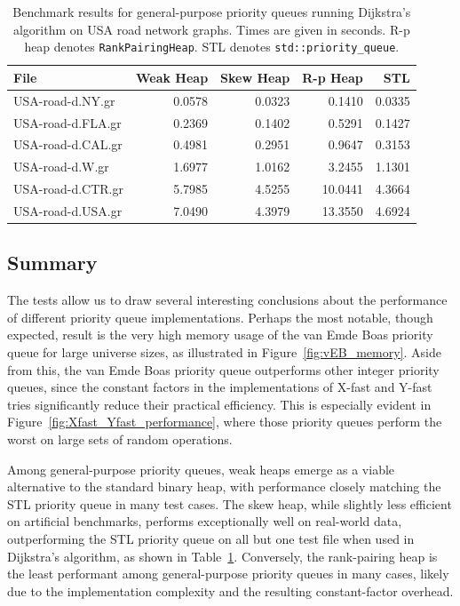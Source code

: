 \begin{table}[ht]
\centering
\begin{tabular}{|l|r|r|r|r|}
\hline
\textbf{File} & \textbf{Weak Heap} & \textbf{Skew Heap} & \textbf{R-p Heap} & \textbf{STL} \\
\hline
USA-road-d.NY.gr   & 0.0578 & 0.0323 & 0.1410 & 0.0335 \\
USA-road-d.FLA.gr  & 0.2369 & 0.1402 & 0.5291 & 0.1427 \\
USA-road-d.CAL.gr  & 0.4981 & 0.2951 & 0.9647 & 0.3153 \\
USA-road-d.W.gr    & 1.6977 & 1.0162 & 3.2455 & 1.1301 \\
USA-road-d.CTR.gr  & 5.7985 & 4.5255 & 10.0441 & 4.3664 \\
USA-road-d.USA.gr  & 7.0490 & 4.3979 & 13.3550 & 4.6924 \\
\hline
\end{tabular}
\caption{Benchmark results for general-purpose priority queues running Dijkstra's algorithm on USA road network graphs. Times are given in seconds. R-p heap denotes \texttt{RankPairingHeap}. STL denotes \texttt{std::priority\_queue}.}
\label{tab:dijkstra_results}
\end{table}

\subsection{Summary}

The tests allow us to draw several interesting conclusions about the performance of different priority queue implementations. Perhaps the most notable, though expected, result is the very high memory usage of the van Emde Boas priority queue for large universe sizes, as illustrated in Figure~\ref{fig:vEB_memory}. Aside from this, the van Emde Boas priority queue outperforms other integer priority queues, since the constant factors in the implementations of X-fast and Y-fast tries significantly reduce their practical efficiency. This is especially evident in Figure~\ref{fig:Xfast_Yfast_performance}, where those priority queues perform the worst on large sets of random operations.

Among general-purpose priority queues, weak heaps emerge as a viable alternative to the standard binary heap, with performance closely matching the STL priority queue in many test cases. The skew heap, while slightly less efficient on artificial benchmarks, performs exceptionally well on real-world data, outperforming the STL priority queue on all but one test file when used in Dijkstra’s algorithm, as shown in Table~\ref{tab:dijkstra_results}. Conversely, the rank-pairing heap is the least performant among general-purpose priority queues in many cases, likely due to the implementation complexity and the resulting constant-factor overhead.
